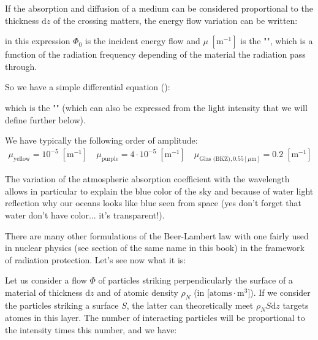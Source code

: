 	If the absorption and diffusion of a medium can be considered proportional to the thickness $\mathrm{d}z$ of the crossing matters, the energy flow variation can be written:
	
	in this expression $\Phi_0$ is the incident energy flow and $\mu\;[\text{m}^{-1}]$ is the "", which is a function of the radiation frequency depending of the material the radiation pass through.
	
	So we have a simple differential equation ():
	
	which is the "" (which can also be expressed from the light intensity that we will define further below).
	
	We have typically the following order of amplitude:
	\begin{gather*}
		\mu_{\text{yellow}}=10^{-5}\;[\text{m}^{-1}]\quad \mu_{\text{purple}}=4\cdot 10^{-5}\;[\text{m}^{-1}]\quad \mu_{\text{Glas (BKZ)},0.55 [\mu\text{m}]}=0.2\;[\text{m}^{-1}]
	\end{gather*}
	\begin{tcolorbox}[title=Remark,colframe=black,arc=10pt]
	The variation of the atmospheric absorption coefficient with the wavelength allows in particular to explain the blue color of the sky and because of water light reflection why our oceans looks like blue seen from space (yes don't forget that water don't have color... it's transparent!).
	\end{tcolorbox}
	There are many other formulations of the Beer-Lambert law with one fairly used in nuclear physics (see section of the same name in this book) in the framework of radiation protection. Let's see now what it is:
	
	Let us consider a flow $\Phi$ of particles striking perpendicularly the surface of a material of thickness $\mathrm{d}z$ and of atomic density $\rho_N$ (in [$\text{atoms}\cdot \text{m}^3$]). If we consider the particles striking a surface $S$, the latter can theoretically meet $\rho_NS\mathrm{d}z$ targets atomes in this layer. The number of interacting particles will be proportional to the intensity times this number, and we have:
	
